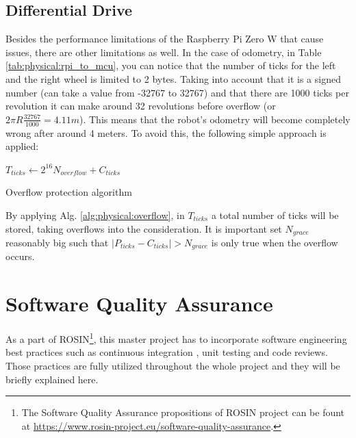 \subsection{Differential Drive}
Besides the performance limitations of the Raspberry Pi Zero W that cause issues, there are other limitations as well. In the case of odometry, in Table \ref{tab:physical:rpi_to_mcu}, you can notice that the number of ticks for the left and the right wheel is limited to 2 bytes. Taking into account that it is a signed number (can take a value from -32767 to 32767) and that there are 1000 ticks per revolution it can make around 32 revolutions before overflow (or $ 2 \pi R \frac{32767}{1000} = 4.11m $). This means that the robot's odometry will become completely wrong after around 4 meters. To avoid this, the following simple approach is applied:

\vspace*{.4cm}
\begin{algorithm}[H]

$ T_{ticks} \leftarrow 2^{16} N_{overflow} + C_{ticks} $\;

\caption{Overflow protection algorithm}
\label{alg:physical:overflow}
\end{algorithm}
\vspace*{.4cm}

By applying Alg. \ref{alg:physical:overflow}, in $ T_{ticks} $ a total number of ticks will be stored, taking overflows into the consideration. It is important set $ N_{grace} $ reasonably big such that $ |P_{ticks} - C_{ticks}| > N_{grace} $ is only true when the overflow occurs.

\section{Software Quality Assurance}
As a part of ROSIN\footnote{The Software Quality Assurance propositions of ROSIN project can be fount at \url{https://www.rosin-project.eu/software-quality-assurance}.}, this master project has to incorporate software engineering best practices such as continuous integration \cite{meyer_continuous_2014}, unit testing and code reviews. Those practices are fully utilized throughout the whole project and they will be briefly explained here.

